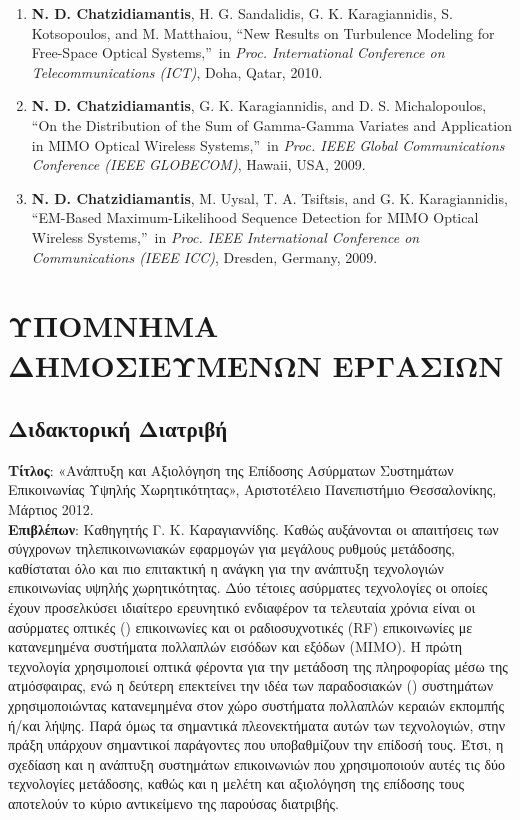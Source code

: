 \documentclass[11pt]{article}
\begin{document}
\begin{enumerate}
\item  \textbf{N. D. Chatzidiamantis}, H. G. Sandalidis, G. K. Karagiannidis, S. Kotsopoulos, and M. Matthaiou,
\textquotedblleft New Results on Turbulence Modeling for Free-Space Optical
Systems,\textquotedblright\ in \emph{Proc. International Conference on Telecommunications (ICT)}, Doha, Qatar,
2010.

\item  \textbf{N. D. Chatzidiamantis}, G. K. Karagiannidis, and D. S. Michalopoulos, \textquotedblleft On
the Distribution of the Sum of Gamma-Gamma Variates and Application in MIMO Optical Wireless
Systems,\textquotedblright\ in \emph{Proc. IEEE Global Communications Conference (IEEE GLOBECOM)}, Hawaii, USA,
2009.

\item  \textbf{N. D. Chatzidiamantis}, M. Uysal, T. A. Tsiftsis, and G. K. Karagiannidis,
\textquotedblleft EM-Based Maximum-Likelihood Sequence Detection for MIMO Optical Wireless
Systems,\textquotedblright\ in \emph{Proc. IEEE International Conference on Communications (IEEE ICC)}, Dresden,
Germany, 2009.
\end{enumerate}

\newpage
\greektext
\section{ ΥΠΟΜΝΗΜΑ ΔΗΜΟΣΙΕΥΜΕΝΩΝ ΕΡΓΑΣΙΩΝ}
\subsection{Διδακτορική Διατριβή}
\textbf{Τίτλος}: «Ανάπτυξη και Αξιολόγηση της Επίδοσης Ασύρματων Συστημάτων Επικοινωνίας Υψηλής Χωρητικότητας», Αριστοτέλειο Πανεπιστήμιο Θεσσαλονίκης, Μάρτιος 2012.\\
\textbf{Επιβλέπων}: Καθηγητής Γ. Κ. Καραγιαννίδης.
\newline\newline
Καθώς αυξάνονται οι απαιτήσεις των σύγχρονων τηλεπικοινωνιακών εφαρμογών για μεγάλους ρυθμούς μετάδοσης, καθίσταται όλο και πιο επιτακτική η ανάγκη για την ανάπτυξη τεχνολογιών επικοινωνίας υψηλής χωρητικότητας. Δύο τέτοιες ασύρματες τεχνολογίες οι οποίες έχουν προσελκύσει ιδιαίτερο ερευνητικό ενδιαφέρον τα τελευταία χρόνια είναι οι ασύρματες οπτικές () \greektext επικοινωνίες και οι ραδιοσυχνοτικές (RF) επικοινωνίες με κατανεμημένα συστήματα πολλαπλών εισόδων και εξόδων (MIMO). Η πρώτη τεχνολογία χρησιμοποιεί οπτικά φέροντα για την μετάδοση της πληροφορίας μέσω της ατμόσφαιρας, ενώ η δεύτερη επεκτείνει την ιδέα των παραδοσιακών () \greektext συστημάτων χρησιμοποιώντας κατανεμημένα στον χώρο συστήματα πολλαπλών κεραιών εκπομπής ή/και λήψης. Παρά όμως τα σημαντικά πλεονεκτήματα αυτών των τεχνολογιών, στην πράξη υπάρχουν σημαντικοί παράγοντες που υποβαθμίζουν την επίδοσή τους. Έτσι, η σχεδίαση και η ανάπτυξη συστημάτων επικοινωνιών που χρησιμοποιούν αυτές τις δύο τεχνολογίες μετάδοσης, καθώς και η μελέτη και αξιολόγηση της επίδοσης τους αποτελούν το κύριο αντικείμενο της παρούσας διατριβής.
\end{document}
